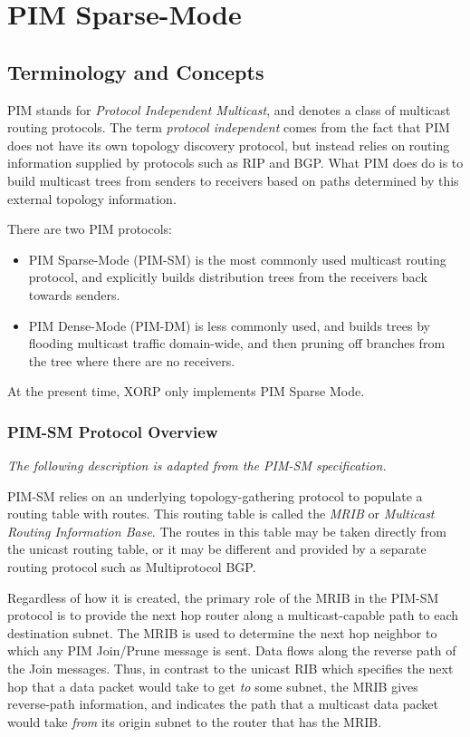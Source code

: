 %
%

\chapter{PIM Sparse-Mode}
\label{pimsm}

\section{Terminology and Concepts}

PIM stands for {\it Protocol Independent Multicast}, and denotes a
class of multicast routing protocols.  The term {\it protocol
independent} comes from the fact that PIM does not have its own
topology discovery protocol, but instead relies on routing information
supplied by protocols such as RIP and BGP.  What PIM does do is to
build multicast trees from senders to receivers based on paths
determined by this external topology information.  

There are two PIM protocols:
\begin{itemize}
\item PIM Sparse-Mode (PIM-SM) is the most commonly used multicast
  routing protocol, and explicitly builds distribution trees from the
  receivers back towards senders.
\item PIM Dense-Mode (PIM-DM) is less commonly used, and builds trees
  by flooding multicast traffic domain-wide, and then pruning off
  branches from the tree where there are no receivers.  
\end{itemize}
At the present time, XORP only implements PIM Sparse Mode.

\subsection{PIM-SM Protocol Overview}

{\it The following description is adapted from the PIM-SM
  specification.  }

PIM-SM relies on an underlying topology-gathering protocol to populate a
routing table with routes.  This routing table is called the {\it MRIB} or
{\it Multicast Routing Information Base}.  The routes in this table may be
taken directly from the unicast routing table, or it may be
different and provided by a separate routing protocol such as
Multiprotocol BGP.

Regardless of how it is created, the primary role of the MRIB in the
PIM-SM protocol
is to provide the next hop router along a multicast-capable
path to each destination subnet.
The MRIB is used to determine the next hop neighbor to which any PIM
Join/Prune message is sent.
Data flows along the reverse path of the Join messages.
Thus, in contrast to the unicast RIB which specifies the
next hop that a data packet would take to get {\it to} some subnet,
the MRIB gives reverse-path information, and indicates the path that
a multicast data packet would take {\it from} 
its origin subnet to the router that has the MRIB.  

